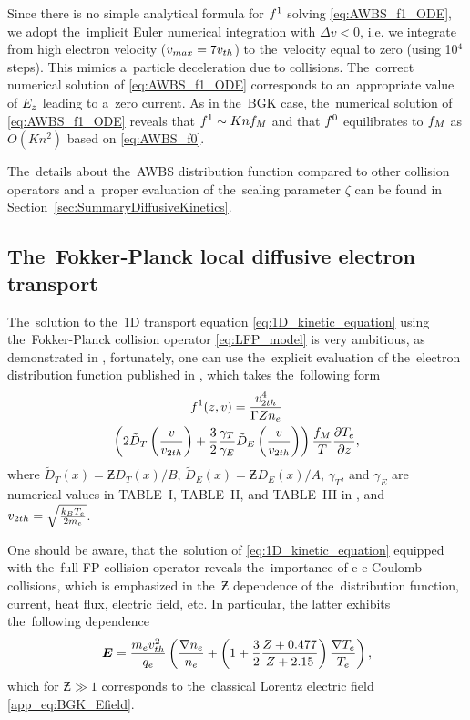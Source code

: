 Since there is no simple analytical formula for $f^1$ solving 
\eqref{eq:AWBS_f1_ODE}, we adopt the~implicit Euler numerical integration
with $\Delta v < 0$, i.e. we integrate from high electron velocity 
($v_{max} = 7v_{th}$) to the~velocity equal to zero (using 10$^4$ steps). 
This mimics a~particle deceleration due to collisions. The~correct numerical
solution of \eqref{eq:AWBS_f1_ODE} corresponds to an~appropriate value of 
$E_z$ leading to a~zero current. 
As in the~BGK case, the~numerical solution of \eqref{eq:AWBS_f1_ODE} reveals
that $f^1 \sim Kn f_M$ and that $f^0$ equilibrates to $f_M$ 
as $O(Kn^2)$ based on \eqref{eq:AWBS_f0}.

The~details about the~AWBS distribution function compared to other
collision operators and a~proper evaluation of the~scaling parameter $\zeta$
can be found in Section~\ref{sec:SummaryDiffusiveKinetics}.

\subsection{The~Fokker-Planck local diffusive electron transport}
\label{sec:FPDiffusiveRegime}

The~solution to the~1D transport equation \eqref{eq:1D_kinetic_equation}
using the~Fokker-Planck collision operator \eqref{eq:LFP_model}
is very ambitious, as demonstrated in 
\cite{Chandrasekhar_RMP1943, CSR_1950, Rosenbluth_PR1957}, fortunately, one 
can use the~explicit evaluation of the~electron distribution function
published in \cite{SpitzerHarm_PR1953}, which takes the~following form
\begin{multline}
  \ft^1(z, \vmag) = %
  \frac{\vtwoh^4}{\Gamma\Zbar n_e}\\
  \left( 2\tilde{D}_T\left(\frac{\vmag}{\vtwoh}\right) 
  + \frac{3}{2}\frac{\gamma_T}{\gamma_E} 
  \tilde{D}_E\left(\frac{\vmag}{\vtwoh}\right) \right)%
  \frac{\fM}{T}\pdv{T_e}{z}  ,
  \label{eq:f1_SH}
\end{multline}
where $\tilde{D}_T(x) = \Zbar D_{T}(x) / B$, 
$\tilde{D}_E(x) = \Zbar D_{E}(x) / A$, $\gamma_T$,
and $\gamma_E$ are numerical values in TABLE~I, TABLE~II, and
TABLE~III in \cite{SpitzerHarm_PR1953}, and 
$v_{2 th} = \sqrt{\frac{k_B T_e}{2m_e}}$.

One should be aware, that the~solution of \eqref{eq:1D_kinetic_equation}
equipped with the~full FP collision operator reveals the~importance of
e-e Coulomb collisions, which is emphasized in the~$\Zbar$ dependence 
of the~distribution function, current, heat flux, electric field, etc.
In particular, the latter exhibits the~following dependence 
\cite{SpitzerHarm_PR1953}
\begin{equation}
  \boldsymbol{E} = \frac{m_e v_{th}^2}{q_e}
  \left(\frac{\nabla n_e}{n_e} + 
  \left(1 + \frac{3}{2}\frac{Z + 0.477}{Z + 2.15} \right)
  \frac{\nabla T_e}{T_e} \right),
  \label{eq:SH_Efield} 
\end{equation}
which for $\Zbar\gg1$ corresponds to the~classical Lorentz electric field 
\eqref{app_eq:BGK_Efield}.

